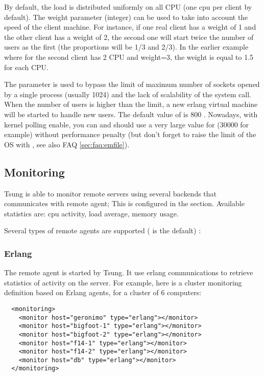 \documentclass{TSUNG-en}
\begin{document}
 By default, the load is distributed uniformly on all CPU (one cpu
 per client by default). The weight parameter (integer) can be used to
 take into account the speed of the client machine. For instance, if
 one real client has a weight of 1 and the other client has a weight
 of 2, the second one will start twice the number of users as the
 first (the proportions will be 1/3 and 2/3). In the earlier example
 where for the second client has 2 CPU and weight=3, the weight is
 equal to 1.5 for each CPU.

 The  parameter is used to bypass the limit of
 maximum number of sockets opened by a single process (usually 1024)
 and the lack of scalability of the  system call. When
 the number of users is higher than the limit, a new erlang virtual
 machine will be started to handle new users. The default value of
  is 800 . Nowadays, with kernel polling enable, you
 can and should use a very large value for  (30000 for example) without
 performance penalty (but don't forget to raise the limit of the OS with
 , see also FAQ \ref{sec:faq:emfile}).

\subsection{Monitoring}

Tsung is able to monitor remote servers using several backends that
communicates with remote agent; This
is configured in the  section. Available
statistics are: cpu activity, load average, memory usage.

Several types of remote agents are supported ( is the default) :

\subsubsection{Erlang}

The remote agent is started by Tsung. It use erlang communications to
retrieve statistics of activity on the server. For example, here is a
cluster monitoring definition based on Erlang agents, for a cluster of
6 computers:

\begin{Verbatim}
  <monitoring>
    <monitor host="geronimo" type="erlang"></monitor>
    <monitor host="bigfoot-1" type="erlang"></monitor>
    <monitor host="bigfoot-2" type="erlang"></monitor>
    <monitor host="f14-1" type="erlang"></monitor>
    <monitor host="f14-2" type="erlang"></monitor>
    <monitor host="db" type="erlang"></monitor>
  </monitoring>
\end{Verbatim}
\end{document}
